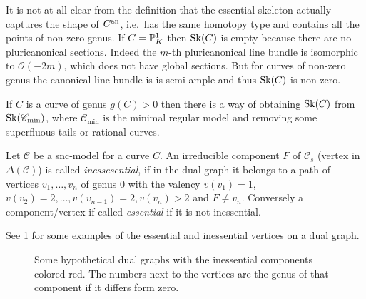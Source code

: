 It is not at all clear from the definition that the essential skeleton actually captures the shape of $C{}^{\text{an}}$, i.e.\ has the same homotopy type and contains all the points of non-zero genus. 
If $C = \mathbb{P}^{1}_K$ then $\operatorname{Sk}(C)$ is empty because there are no pluricanonical sections. Indeed the $m$-th pluricanonical line bundle is isomorphic to  $\mathcal{O}(-2m)$, which does not have global sections. 
But for curves of non-zero genus the canonical line bundle is is semi-ample and thus $\operatorname{Sk}(C)$ is non-zero. 

If $C$ is a curve of genus $g(C) > 0$ then there is a way of obtaining $\operatorname{Sk}(C)$ from $\operatorname{Sk}(\mathscr C_\text{min} )$, where $\mathscr C _\text{min}$ is the minimal regular model and removing some superfluous tails or rational curves.  

\begin{definition}
	Let $\mathscr C$ be a snc-model for a curve $C$. 
	An irreducible component $F$ of $\mathscr C_s$ (vertex in $\Delta(\mathscr C)$) is called \emph{inessesential}, if in the dual graph it belongs to a path of vertices $v_1, \ldots, v_n$ of genus $0$ with the valency $v(v_1) = 1$, $v(v_{2}) = 2, \ldots, v(v_{n-1}) = 2, v(v_n) > 2$ and $F \ne v_n$. 
	Conversely a component/vertex if called \emph{essential} if it is not inessential. 
\end{definition}
See \cref{fig:inessential_components} for some examples of the essential and inessential vertices on a dual graph. 

\begin{figure}[h]
    \centering
    \caption{Some hypothetical dual graphs with the inessential components colored red. 
    The numbers next to the vertices are the genus of that component if it differs form zero.}
    \label{fig:inessential_components}
\end{figure}

